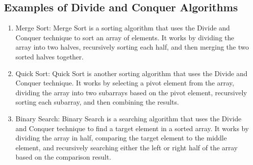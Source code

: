 \documentclass[a4paper, 11pt, oneside]{book} %
\begin{document}
\vspace{0.75\baselineskip}



\subsection{Examples of Divide and Conquer Algorithms}

\begin{enumerate}
  \item Merge Sort: Merge Sort is a sorting algorithm that uses the Divide and Conquer technique to sort an array of elements. It works by dividing the array into two halves, recursively sorting each half, and then merging the two sorted halves together.
  \item Quick Sort: Quick Sort is another sorting algorithm that uses the Divide and Conquer technique. It works by selecting a pivot element from the array, dividing the array into two subarrays based on the pivot element, recursively sorting each subarray, and then combining the results.
  \item Binary Search: Binary Search is a searching algorithm that uses the Divide and Conquer technique to find a target element in a sorted array. It works by dividing the array in half, comparing the target element to the middle element, and recursively searching either the left or right half of the array based on the comparison result.
\end{enumerate}

\vspace{0.75\baselineskip}
\end{document}
